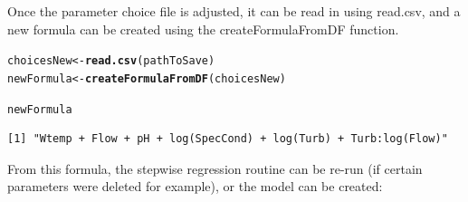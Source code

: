 \documentclass[a4paper,11pt]{article}\usepackage[]{graphicx}\usepackage[]{color}
\makeatletter
\newcommand{\hlstd}[1]{\textcolor[rgb]{0.345,0.345,0.345}{#1}}%
\newcommand{\hlkwb}[1]{\textcolor[rgb]{0.69,0.353,0.396}{#1}}%
\newcommand{\hlkwd}[1]{\textcolor[rgb]{0.737,0.353,0.396}{\textbf{#1}}}%
\newenvironment{kframe}{%
 \def\at@end@of@kframe{}%
 \ifinner\ifhmode%
  \def\at@end@of@kframe{\end{minipage}}%
  \begin{minipage}{\columnwidth}%
 \fi\fi%
 \def\FrameCommand##1{\hskip\@totalleftmargin \hskip-\fboxsep
 \colorbox{shadecolor}{##1}\hskip-\fboxsep
     \hskip-\linewidth \hskip-\@totalleftmargin \hskip\columnwidth}%
 \MakeFramed {\advance\hsize-\width
   \@totalleftmargin\z@ \linewidth\hsize
   \@setminipage}}%
 {\par\unskip\endMakeFramed%
 \at@end@of@kframe}
\newenvironment{knitrout}{}{} %
\makeatother
\begin{document}
Once the parameter choice file is adjusted, it can be read in using read.csv, and a new formula can be created using the createFormulaFromDF function.

\begin{knitrout}
\color{fgcolor}\begin{kframe}
\begin{alltt}
\hlstd{choicesNew} \hlkwb{<-} \hlkwd{read.csv}\hlstd{(pathToSave)}
\hlstd{newFormula} \hlkwb{<-}\hlkwd{createFormulaFromDF}\hlstd{(choicesNew)}
\end{alltt}
\end{kframe}
\end{knitrout}





\begin{knitrout}
\color{fgcolor}\begin{kframe}
\begin{alltt}
\hlstd{newFormula}
\end{alltt}
\begin{verbatim}
[1] "Wtemp + Flow + pH + log(SpecCond) + log(Turb) + Turb:log(Flow)"
\end{verbatim}
\end{kframe}
\end{knitrout}


From this formula, the stepwise regression routine can be re-run (if certain parameters were deleted for example), or the model can be created:
\end{document}
